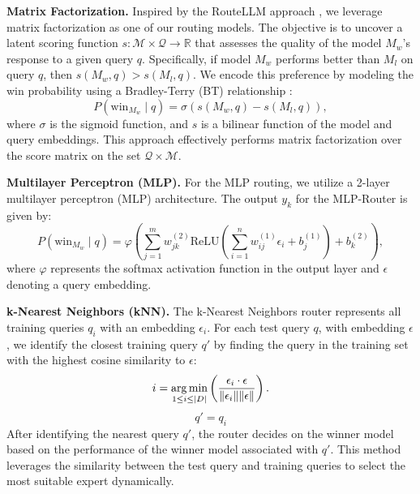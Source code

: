 \textbf{Matrix Factorization.} Inspired by the RouteLLM approach \cite{Ong2024RouteLLMLT, 5197422}, we leverage matrix factorization as one of our routing models. The objective is to uncover a latent scoring function \( s: \mathcal{M} \times \mathcal{Q} \rightarrow \mathbb{R} \) that assesses the quality of the model \( M_w \)'s response to a given query \( q \). Specifically, if model \( M_w \) performs better than \( M_l \) on query \( q \), then \( s(M_w, q) > s(M_l, q) \). We encode this preference by modeling the win probability using a Bradley-Terry (BT) relationship \cite{Bradley1952RankAO}:
\begin{equation}
P(\text{win}_{M_w} \mid q) = \sigma(s(M_w, q) - s(M_l, q)),
\end{equation}
where \( \sigma \) is the sigmoid function, and \( s \) is a bilinear function of the model and query embeddings. This approach effectively performs matrix factorization over the score matrix on the set \( \mathcal{Q} \times \mathcal{M} \).

\textbf{Multilayer Perceptron (MLP).} For the MLP routing, we utilize a 2-layer multilayer perceptron (MLP) architecture. The output \( y_k \) for the MLP-Router is given by:
\begin{equation}
P(\text{win}_{M_w} \mid q) = \varphi \left( \sum_{j=1}^{m} w_{jk}^{(2)} \text{ReLU} \left( \sum_{i=1}^{n} w_{ij}^{(1)} \epsilon_i + b_j^{(1)} \right) + b_k^{(2)} \right),
\end{equation}
where \( \varphi \) represents the softmax activation function in the output layer and \( \epsilon \) denoting a query embedding.

\textbf{k-Nearest Neighbors (kNN).}
The k-Nearest Neighbors router represents all training queries \( q_i \) with an embedding \( \epsilon_i \). For each test query \( q \), with embedding \( \epsilon\), we identify the closest training query \( q' \) by finding the query in the training set with the highest cosine similarity to \( \epsilon \):
\begin{equation}
i = \operatorname*{arg\,min}_{1 \leq i \leq |D|} \left( \frac{\epsilon_i \cdot \epsilon}{\|\epsilon_i\| \|\epsilon\|} \right).
\end{equation}
\begin{equation}
q' = q_i
\end{equation}
After identifying the nearest query \( q' \), the router decides on the winner model based on the performance of the winner model associated with \( q' \). 
This method leverages the similarity between the test query and training queries to select the most suitable expert dynamically.


